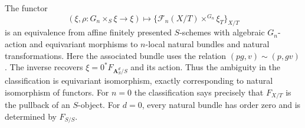 \begin{theorem}
\label{geo-F-fixed}
The functor
\[
 (\xi,\rho:G_n\times_S\xi\to\xi)
 \longmapsto
 \bigl\{\mathcal F_n(X/T)\mathbin{\times^{G_n}}\xi_T\bigr\}_{X/T}
\]
is an equivalence from affine finitely presented $S$-schemes with algebraic
$G_n$-action and equivariant morphisms to $n$-local natural bundles and
natural transformations. Here the associated bundle uses the relation
$(p g,v)\sim(p,g v)$. The inverse recovers
$\xi=0^*F_{\mathbf A^d_S/S}$ and its action. Thus the ambiguity in the
classification is equivariant isomorphism, exactly corresponding to natural
isomorphism of functors. For $n=0$ the classification says precisely that
$F_{X/T}$ is the pullback of an $S$-object. For $d=0$, every natural bundle
has order zero and is determined by $F_{S/S}$.
\end{theorem}
